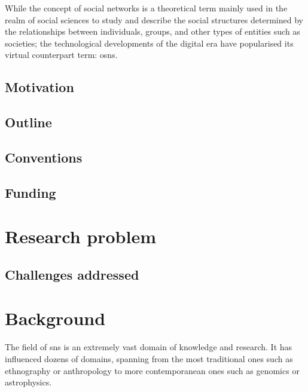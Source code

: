 \documentclass[showtrims]{kthesis}
\begin{document}
While the concept of social networks is a theoretical term mainly used in the realm 
of social sciences to study and describe the social structures determined by the 
relationships between individuals, groups, and other types of entities such as societies; 
the technological developments of the digital era have popularised its virtual counterpart 
term: \aclp{osn}.

%
%
%
%
%
%
%
%
%

\section{Motivation}
\section{Outline}
\section{Conventions}
\section{Funding}

\chapter{Research problem}
\section{Challenges addressed}

\chapter{Background}
The field of \acp{sn} is an extremely vast domain of knowledge and research. It 
has influenced dozens of domains, spanning from the most traditional ones such as 
ethnography or anthropology to more contemporanean ones such as genomics or astrophysics.
\end{document}
